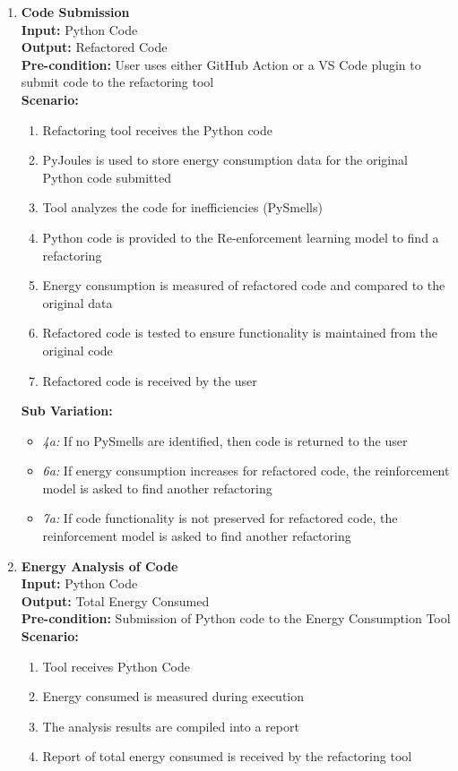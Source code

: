 \documentclass[12pt]{article}
\begin{document}
\begin{enumerate}[label={\bf BUC \arabic*:}, wide=0pt, font=\itshape]
  \item {\bf Code Submission} \\[2mm]
    \textbf{Input:} Python Code \\
    \textbf{Output:} Refactored Code \\
    \textbf{Pre-condition:} User uses either GitHub Action or a VS Code plugin to submit code to the refactoring tool \\[2mm]  
    \textbf{Scenario:}
      \begin{enumerate}[label=\arabic*.]
        \item Refactoring tool receives the Python code
        \item PyJoules is used to store energy consumption data for the original Python code submitted
        \item Tool analyzes the code for inefficiencies (PySmells)
        \item Python code is provided to the Re-enforcement learning model to find a refactoring
        \item Energy consumption is measured of refactored code and compared to the original data
        \item Refactored code is tested to ensure functionality is maintained from the original code
        \item Refactored code is received by the user
      \end{enumerate}
    \textbf{Sub Variation: }
      \begin{itemize}
        \item \textit{4a:} If no PySmells are identified, then code is returned to the user
        \item \textit{6a:} If energy consumption increases for refactored code, the reinforcement model is asked to find another refactoring
        \item \textit{7a:} If code functionality is not preserved for refactored code, the reinforcement model is asked to find another refactoring
      \end{itemize}

  \item {\bf Energy Analysis of Code}\\[2mm]
    \textbf{Input:} Python Code \\
    \textbf{Output:} Total Energy Consumed \\
    \textbf{Pre-condition:} Submission of Python code to the Energy Consumption Tool \\[2mm]
    \textbf{Scenario: } 
    \begin{enumerate}[label=\arabic*.]
        \item Tool receives Python Code
        \item Energy consumed is measured during execution
        \item The analysis results are compiled into a report
        \item Report of total energy consumed is received by the refactoring tool
    \end{enumerate}
  

\end{enumerate}
\end{document}
